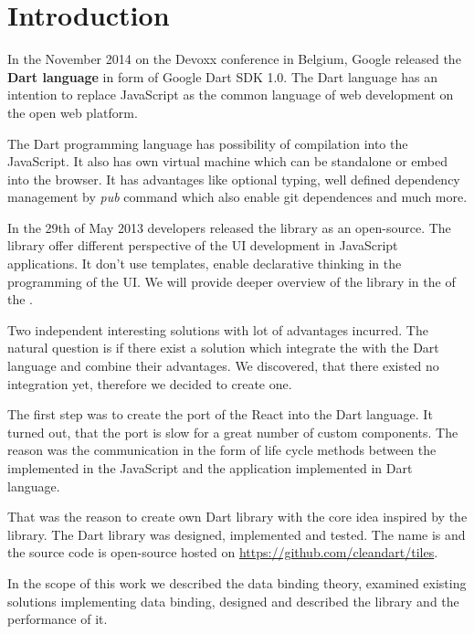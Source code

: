 \chapter*{Introduction}\label{chap:intro}

In the November 2014 on the Devoxx conference in Belgium, 
Google released the \textbf{Dart language} in form of Google Dart SDK 1.0.
The Dart language has an intention to replace JavaScript as the common language of web development on the open web platform.
\cite{dartlaunch}

The Dart programming language has possibility of compilation into the JavaScript. 
It also has own virtual machine which can be standalone or embed into the browser.
It has advantages like optional typing, 
well defined dependency management by \textit{pub} command which also enable git dependences and much more.

In the 29th of May 2013 \facebook developers released the \textbf{\react} library as an open-source. 
The \react library offer different perspective of the UI development in JavaScript applications. 
It don't use templates, enable declarative thinking in the programming of the UI.
We will provide deeper overview of the \react library in the  of the .

Two independent interesting solutions with lot of advantages incurred. 
The natural question is if there exist a solution which integrate the \react with the Dart language and combine their advantages.
We discovered, that there existed no integration yet, therefore we decided to create one. 

The first step was to create the port of the React into the Dart language.
It turned out, that the port is slow for a great number of custom components. 
The reason was the communication in the form of life cycle methods 
between the \react implemented in the JavaScript and the application implemented in Dart language.

That was the reason to create own Dart library with the core idea inspired by the \react library. 
The Dart library was designed, implemented and tested. 
The name is \tiles and the source code is open-source hosted on \url{https://github.com/cleandart/tiles}.

In the scope of this work we described the data binding theory, 
examined existing solutions implementing data binding, 
designed and described the \tiles library and the performance of it.

